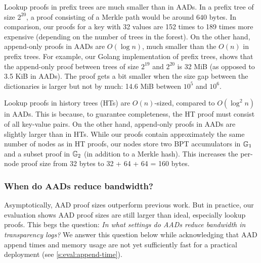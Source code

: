 Lookup proofs in prefix trees are much smaller than in AADs.
In a prefix tree of size $2^{20}$, a proof consisting of a Merkle path would be around $640$ bytes.
In comparison, our proofs for a key with 32 values are 152 times to 189 times more expensive (depending on the number of trees in the forest).
On the other hand, append-only proofs in AADs are $O(\log{n})$, much smaller than the $O(n)$ in prefix trees.
For example, our Golang implementation of prefix trees, shows that the append-only proof between trees of size $2^{19}$ and $2^{20}$ is 32 MiB (as opposed to 3.5 KiB in AADs).
The proof gets a bit smaller when the size gap between the dictionaries is larger but not by much: 14.6 MiB between $10^5$ and $10^6$.

Lookup proofs in history trees (HTs) are $O(n)$-sized, compared to $O(\log^2{n})$ in AADs.
This is because, to guarantee completeness, the HT proof must consist of all key-value pairs.
On the other hand, append-only proofs in AADs are slightly larger than in HTs.
While our proofs contain approximately the same number of nodes as in HT proofs, our nodes store two BPT accumulators in $\mathbb{G}_1$ and a subset proof in $\mathbb{G}_2$ (in addition to a Merkle hash).
This increases the per-node proof size from 32 bytes to 32 + 64 + 64 = 160 bytes.




\subsubsection{When do AADs reduce bandwidth?}
\label{s:eval:worth-it}
Asymptotically, AAD proof sizes outperform previous work.
But in practice, our evaluation shows AAD proof sizes are still larger than ideal, especially lookup proofs.
This begs the question: \textit{In what settings do AADs reduce bandwidth in transparency logs?}
We answer this question below while acknowledging that AAD append times and memory usage are not yet sufficiently fast for a practical deployment (see \cref{s:eval:append-time}).

